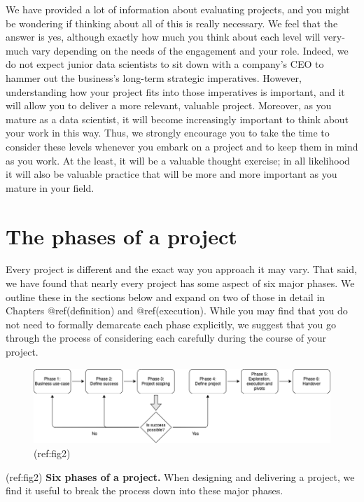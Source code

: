 \documentclass[]{book}
\begin{document}
We have provided a lot of information about evaluating projects, and you
might be wondering if thinking about all of this is really necessary. We
feel that the answer is yes, although exactly how much you think about
each level will very-much vary depending on the needs of the engagement
and your role. Indeed, we do not expect junior data scientists to sit
down with a company's CEO to hammer out the business's long-term
strategic imperatives. However, understanding how your project fits into
those imperatives is important, and it will allow you to deliver a more
relevant, valuable project. Moreover, as you mature as a data scientist,
it will become increasingly important to think about your work in this
way. Thus, we strongly encourage you to take the time to consider these
levels whenever you embark on a project and to keep them in mind as you
work. At the least, it will be a valuable thought exercise; in all
likelihood it will also be valuable practice that will be more and more
important as you mature in your field.

\hypertarget{phases}{%
\chapter{The phases of a project}\label{phases}}

Every project is different and the exact way you approach it may vary.
That said, we have found that nearly every project has some aspect of
six major phases. We outline these in the sections below and expand on
two of those in detail in Chapters @ref(definition) and @ref(execution).
While you may find that you do not need to formally demarcate each phase
explicitly, we suggest that you go through the process of considering
each carefully during the course of your project.

\begin{smaller}

\begin{figure}
\includegraphics[width=1\linewidth]{figures/Figure_2-phases} \caption{(ref:fig2)}\label{fig:bottom-fig}
\end{figure}

(ref:fig2) \textbf{Six phases of a project.} When designing and
delivering a project, we find it useful to break the process down into
these major phases.

\end{smaller}
\end{document}
